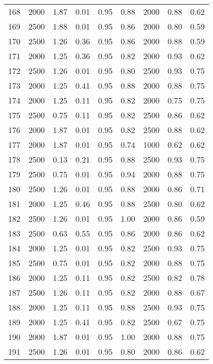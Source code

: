 \begin{longtable}[c]{ccccccccc}
168 &  2000 &  1.87 &  0.01 &  0.95 &  0.88 &  2000 &  0.88 &  0.62 \\
169 &  2500 &  1.88 &  0.01 &  0.95 &  0.86 &  2000 &  0.80 &  0.59 \\
170 &  2500 &  1.26 &  0.36 &  0.95 &  0.86 &  2000 &  0.88 &  0.59 \\
171 &  2000 &  1.25 &  0.36 &  0.95 &  0.82 &  2000 &  0.93 &  0.62 \\
172 &  2500 &  1.26 &  0.01 &  0.95 &  0.80 &  2500 &  0.93 &  0.75 \\
173 &  2000 &  1.25 &  0.41 &  0.95 &  0.88 &  2000 &  0.88 &  0.75 \\
174 &  2000 &  1.25 &  0.11 &  0.95 &  0.82 &  2000 &  0.75 &  0.75 \\
175 &  2500 &  0.75 &  0.11 &  0.95 &  0.82 &  2500 &  0.86 &  0.62 \\
176 &  2000 &  1.87 &  0.01 &  0.95 &  0.82 &  2500 &  0.88 &  0.62 \\
177 &  2000 &  1.87 &  0.01 &  0.95 &  0.74 &  1000 &  0.62 &  0.62 \\
178 &  2500 &  0.13 &  0.21 &  0.95 &  0.88 &  2500 &  0.93 &  0.75 \\
179 &  2500 &  0.75 &  0.01 &  0.95 &  0.94 &  2000 &  0.88 &  0.75 \\
180 &  2500 &  1.26 &  0.01 &  0.95 &  0.88 &  2000 &  0.86 &  0.71 \\
181 &  2000 &  1.25 &  0.46 &  0.95 &  0.88 &  2500 &  0.80 &  0.62 \\
182 &  2500 &  1.26 &  0.01 &  0.95 &  1.00 &  2000 &  0.86 &  0.59 \\
183 &  2500 &  0.63 &  0.55 &  0.95 &  0.86 &  2000 &  0.86 &  0.62 \\
184 &  2000 &  1.25 &  0.01 &  0.95 &  0.82 &  2500 &  0.93 &  0.75 \\
185 &  2500 &  0.75 &  0.01 &  0.95 &  0.82 &  2000 &  0.88 &  0.75 \\
186 &  2000 &  1.25 &  0.11 &  0.95 &  0.82 &  2500 &  0.82 &  0.78 \\
187 &  2500 &  1.26 &  0.11 &  0.95 &  0.82 &  2000 &  0.88 &  0.67 \\
188 &  2000 &  1.25 &  0.11 &  0.95 &  0.88 &  2500 &  0.93 &  0.75 \\
189 &  2000 &  1.25 &  0.41 &  0.95 &  0.82 &  2500 &  0.67 &  0.75 \\
190 &  2000 &  1.87 &  0.01 &  0.95 &  1.00 &  2000 &  0.88 &  0.75 \\
191 &  2500 &  1.26 &  0.01 &  0.95 &  0.80 &  2000 &  0.86 &  0.62 \\

\end{longtable}
